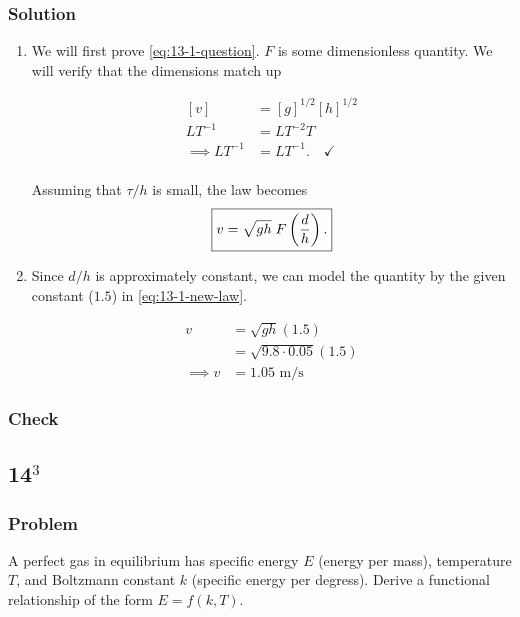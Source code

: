 \documentclass[12pt]{article}
\begin{document}
  \subsubsection*{Solution}
  \begin{enumerate}
  \item We will first prove \cref{eq:13-1-question}. $F$ is some dimensionless
    quantity. We will verify that the dimensions match up

    \begin{equation}
      \begin{aligned}
        [v] &= [g]^{1/2}[h]^{1/2} \\
        LT^{-1} &= LT^{-2}T \\
        \implies LT^{-1} &= LT^{-1}. \quad \checkmark \\
      \end{aligned}
    \end{equation}

    Assuming that $\tau/h$ is small, the law becomes
    \begin{equation} \boxed {
        \label{eq:13-1-new-law}
        v=\sqrt{gh}\; F\left(\frac{d}{h}\right).
      }
    \end{equation}

  \item Since $d/h$ is approximately constant, we can model the quantity by the
    given constant ($1.5$) in \cref{eq:13-1-new-law}.

    \begin{equation} \boxed{
        \begin{aligned}
          v &= \sqrt{gh}(1.5) \\
          &= \sqrt{9.8\cdot0.05}(1.5) \\
          \implies v &= 1.05 \text{ m/s}
        \end{aligned}
      }
    \end{equation}
  \end{enumerate}

  \subsubsection*{Check}
  \todo

\subsection{14$^3$}
  \subsubsection*{Problem}
  A perfect gas in equilibrium has specific energy $E$ (energy per mass),
  temperature $T$, and Boltzmann constant $k$ (specific energy per degress).
  Derive a functional relationship of the form $E=f(k,T)$.
\end{document}
